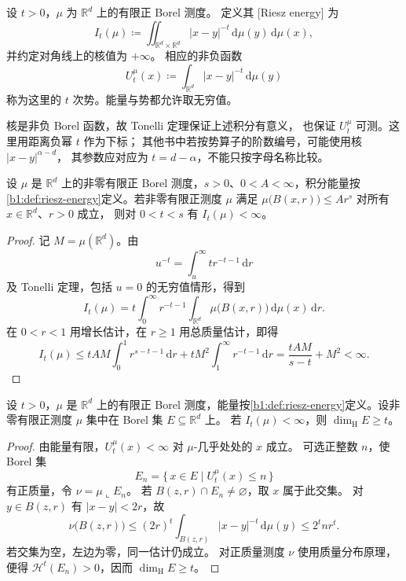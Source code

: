 \begin{definition}\label{b1:def:riesz-energy}
设 \(t>0\)，\(\mu\) 为 \(\mathbb R^d\) 上的有限正 Borel 测度。
定义其 [Riesz energy] 为
\[
 I_t(\mu)\coloneqq\iint_{\mathbb R^d\times\mathbb R^d}|x-y|^{-t}\,\mathrm{d}\mu(y)\,\mathrm{d}\mu(x),
\]
并约定对角线上的核值为 \(+\infty\)。
相应的非负函数
\[
 U_t^\mu(x)\coloneqq\int_{\mathbb R^d}|x-y|^{-t}\,\mathrm{d}\mu(y)
\]
称为这里的 \(t\) 次势。能量与势都允许取无穷值。
\end{definition}

核是非负 Borel 函数，故 Tonelli 定理保证上述积分有意义，
也保证 \(U_t^\mu\) 可测。这里用距离负幂 \(t\) 作为下标；
其他书中若按势算子的阶数编号，可能使用核 \(|x-y|^{\alpha-d}\)，
其参数应对应为 \(t=d-\alpha\)，不能只按字母名称比较。

\begin{proposition}\label{b1:prop:frostman-finite-energy}
设 \(\mu\) 是 \(\mathbb R^d\) 上的非零有限正 Borel 测度，\(s>0\)、\(0<A<\infty\)，积分能量按\cref{b1:def:riesz-energy}定义。若非零有限正测度 \(\mu\) 满足
\(\mu\bigl(B(x,r)\bigr)\leq A r^s\) 对所有 \(x\in\mathbb R^d\)、\(r>0\) 成立，
则对 \(0<t<s\) 有 \(I_t(\mu)<\infty\)。
\end{proposition}
\begin{proof}
记 \(M=\mu(\mathbb R^d)\)。由
\[
 u^{-t}=\int_u^\infty t r^{-t-1}\,\mathrm{d}r
\]
及 Tonelli 定理，包括 \(u=0\) 的无穷值情形，得到
\begin{equation}\label{b1:eq:energy-ball-integral}
 I_t(\mu)=t\int_0^\infty r^{-t-1}
       \int_{\mathbb R^d}\mu\bigl(B(x,r)\bigr)\,\mathrm{d}\mu(x)\,\mathrm{d}r.
\end{equation}
在 \(0<r<1\) 用增长估计，在 \(r\geq1\) 用总质量估计，即得
\[
 I_t(\mu)\leq tAM\int_0^1r^{s-t-1}\,\mathrm{d}r+
 tM^2\int_1^\infty r^{-t-1}\,\mathrm{d}r
 =\frac{tAM}{s-t}+M^2<\infty.
\]
\end{proof}

\begin{proposition}\label{b1:prop:finite-energy-dimension}
设 \(t>0\)，\(\mu\) 是 \(\mathbb R^d\) 上的有限正 Borel 测度，能量按\cref{b1:def:riesz-energy}定义。设非零有限正测度 \(\mu\) 集中在 Borel 集 \(E\subseteq\mathbb R^d\) 上。
若 \(I_t(\mu)<\infty\)，则 \(\dim_{\mathrm H}E\geq t\)。
\end{proposition}
\begin{proof}
由能量有限，\(U_t^\mu(x)<\infty\) 对 \(\mu\)-几乎处处的 \(x\) 成立。
可选正整数 \(n\)，使 Borel 集
\[
 E_n=\{\,x\in E\mid U_t^\mu(x)\leq n\,\}
\]
有正质量，令 \(\nu=\mu\llcorner E_n\)。
若 \(B(z,r)\cap E_n\ne\varnothing\)，取 \(x\) 属于此交集。
对 \(y\in B(z,r)\) 有 \(|x-y|<2r\)，故
\[
 \nu\bigl(B(z,r)\bigr)
 \leq(2r)^t\int_{B(z,r)}|x-y|^{-t}\,\mathrm{d}\mu(y)
 \leq 2^t n r^t.
\]
若交集为空，左边为零，同一估计仍成立。
对正质量测度 \(\nu\) 使用质量分布原理，便得
\(\mathcal H^t(E_n)>0\)，因而 \(\dim_{\mathrm H}E\geq t\)。
\end{proof}

